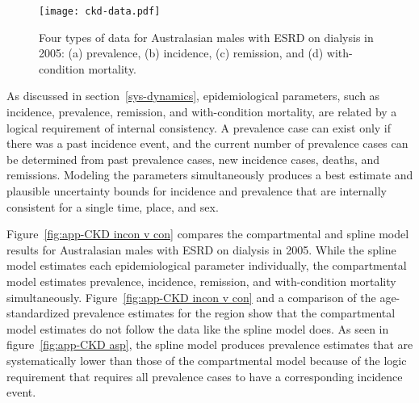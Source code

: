 
    \begin{figure}[h]
        \begin{center}
            \texttt{[image: ckd-data.pdf]}
            \caption{Four types of data for Australasian males with ESRD on dialysis
              in 2005: (a) prevalence, (b) incidence, (c)
              remission, and (d) with-condition mortality.}
            \label{fig:app-CKD data}
        \end{center}
    \end{figure}

As discussed in section~\ref{sys-dynamics}, epidemiological parameters,
such as incidence, prevalence, remission, and with-condition
mortality, are related by a logical requirement of internal
consistency.  A prevalence case can exist only if there was a past
incidence event, and the current number of prevalence cases can be
determined from past prevalence cases, new incidence cases, deaths, and
remissions.  Modeling the parameters simultaneously produces a best
estimate and plausible uncertainty bounds for incidence and prevalence
that are internally consistent for a single time, place, and sex.

Figure~\ref{fig:app-CKD incon v con} compares the compartmental and
spline model results for Australasian males with
ESRD on dialysis in 2005.  While the spline model estimates each
epidemiological parameter individually, the compartmental model estimates
prevalence, incidence, remission, and with-condition mortality
simultaneously.  Figure~\ref{fig:app-CKD incon v con} and a
comparison of the age-standardized prevalence estimates for the region
show that the compartmental model estimates do not follow the data
like the spline model does.  As seen in figure~\ref{fig:app-CKD asp}, the
spline model produces prevalence estimates that are systematically lower
than those of the compartmental model because of the logic requirement that
requires all prevalence cases to have a corresponding incidence event.

